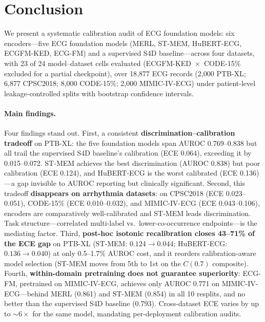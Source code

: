 \section{Conclusion}
\label{sec:conclusion}

We present a systematic calibration audit of ECG foundation models: six encoders---five ECG
foundation models (MERL, ST-MEM, HuBERT-ECG, ECGFM-KED, ECG-FM) and a supervised S4D
baseline---across four datasets, with 23 of 24 model--dataset cells evaluated
(ECGFM-KED~$\times$~CODE-15\% excluded for a partial checkpoint), over 18{,}877 ECG records
(2{,}000 PTB-XL; 6{,}877 CPSC2018; 8{,}000 CODE-15\%; 2{,}000 MIMIC-IV-ECG) under
patient-level leakage-controlled splits with bootstrap confidence intervals.

\paragraph{Main findings.}
Four findings stand out. First, a consistent \textbf{discrimination--calibration tradeoff}
on PTB-XL: the five foundation models span AUROC 0.769--0.838 but all trail the supervised
S4D baseline's calibration (ECE 0.064), exceeding it by 0.015--0.072. ST-MEM achieves the
best discrimination (AUROC 0.838) but poor calibration (ECE 0.124), and HuBERT-ECG is the
worst calibrated (ECE 0.136)---a gap invisible to AUROC reporting but clinically significant.
Second, this tradeoff \textbf{disappears on arrhythmia datasets}: on CPSC2018
(ECE 0.023--0.051), CODE-15\% (ECE 0.010--0.032), and MIMIC-IV-ECG (ECE 0.043--0.106),
encoders are comparatively well-calibrated and ST-MEM leads discrimination. Task
structure---correlated multi-label vs.\ lower-co-occurrence endpoints---is the mediating factor. Third, \textbf{post-hoc
isotonic recalibration closes 43--71\% of the ECE gap} on PTB-XL (ST-MEM: $0.124\to0.044$;
HuBERT-ECG: $0.136\to0.040$) at only 0.5--1.7\% AUROC cost, and it reorders calibration-aware
model selection (ST-MEM moves from 5th to 1st on the $C(0.7)$ composite). Fourth,
\textbf{within-domain pretraining does not guarantee superiority}: ECG-FM, pretrained on
MIMIC-IV-ECG, achieves only AUROC 0.771 on MIMIC-IV-ECG---behind MERL (0.861) and ST-MEM
(0.854) in all 10 resplits, and no better than the supervised S4D baseline (0.793).
Cross-dataset ECE varies by up to ${\sim}6\times$ for
the same model, mandating per-deployment calibration audits.

